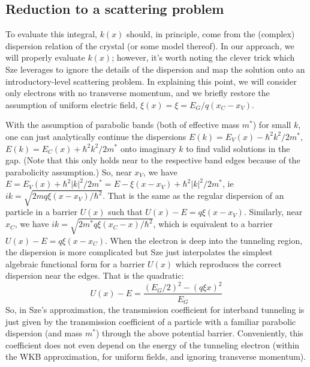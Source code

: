 \subsection{Reduction to a scattering problem}
To evaluate this integral, $k(x)$ should, in principle, come from the (complex) dispersion relation of the crystal (or some model thereof).  In our approach, we will properly evaluate $k(x)$; however, it's worth noting the clever trick which Sze leverages to ignore the details of the dispersion and map the solution onto an introductory-level scattering problem.  In explaining this point, we will consider only electrons with no transverse momentum, and we briefly restore the assumption of uniform electric field, $\xi(x)=\xi=E_G/q(x_C-x_V)$.

With the assumption of parabolic bands (both of effective mass $m^*$) for small $k$, one can just analytically continue the dispersions $E(k)=E_V(x)-\hbar^2k^2/2m^*$, $E(k)=E_C(x)+\hbar^2k^2/2m^*$ onto imaginary $k$ to find valid solutions in the gap.  (Note that this only holds near to the respective band edges because of the parabolicity assumption.)  So, near $x_V$, we have $E=E_V(x)+\hbar^2|k|^2/2m^*=E-\xi(x-x_V)+\hbar^2|k|^2/2m^*$, ie $ik=\sqrt{2mq\xi(x-x_V)/\hbar^2}$.  That is the same as the regular dispersion of an particle in a barrier $U(x)$ such that $U(x)-E=q\xi(x-x_V)$.  Similarly, near $x_C$, we have $ik=\sqrt{2m^*q\xi(x_C-x)/\hbar^2}$, which is equivalent to a barrier $U(x)-E=q\xi(x-x_C)$.  When the electron is deep into the tunneling region, the dispersion is more complicated but Sze just interpolates the simplest algebraic functional form for a barrier $U(x)$ which reproduces the correct dispersion near the edges.  That is the quadratic:
$$U(x)-E=\frac{(E_G/2)^2-(q\xi x)^2}{E_G}$$
So, in Sze's approximation, the transmission coefficient for interband tunneling is just given by the transmission coefficient of a particle with a familiar parabolic dispersion (and mass $m^*$) through the above potential barrier.  Conveniently, this coefficient does not even depend on the energy of the tunneling electron (within the WKB approximation, for uniform fields, and ignoring transverse momentum).